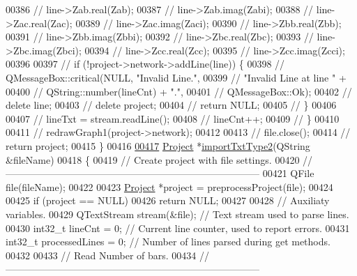 \begin{DoxyCode}
00386 \textcolor{comment}{//    line->Zab.real(Zab);}
00387 \textcolor{comment}{//    line->Zab.imag(Zabi);}
00388 \textcolor{comment}{//    line->Zac.real(Zac);}
00389 \textcolor{comment}{//    line->Zac.imag(Zaci);}
00390 \textcolor{comment}{//    line->Zbb.real(Zbb);}
00391 \textcolor{comment}{//    line->Zbb.imag(Zbbi);}
00392 \textcolor{comment}{//    line->Zbc.real(Zbc);}
00393 \textcolor{comment}{//    line->Zbc.imag(Zbci);}
00394 \textcolor{comment}{//    line->Zcc.real(Zcc);}
00395 \textcolor{comment}{//    line->Zcc.imag(Zcci);}
00396 
00397 \textcolor{comment}{//    if (!project->network->addLine(line)) \{}
00398 \textcolor{comment}{//      QMessageBox::critical(NULL, "Invalid Line.",}
00399 \textcolor{comment}{//                            "Invalid Line at line " +}
00400 \textcolor{comment}{//                            QString::number(lineCnt) + ".",}
00401 \textcolor{comment}{//                            QMessageBox::Ok);}
00402 \textcolor{comment}{//      delete line;}
00403 \textcolor{comment}{//      delete project;}
00404 \textcolor{comment}{//      return NULL;}
00405 \textcolor{comment}{//    \}}
00406 
00407 \textcolor{comment}{//    lineTxt = stream.readLine();}
00408 \textcolor{comment}{//    lineCnt++;}
00409 \textcolor{comment}{//  \}}
00410 
00411 \textcolor{comment}{//  redrawGraph1(project->network);}
00412 
00413 \textcolor{comment}{//  file.close();}
00414 \textcolor{comment}{//  return project;}
00415 \}
00416 
\hypertarget{import_8cpp_source_l00417}{}\hyperlink{import_8h_a05a39d4117f6721dc4bbdd7d45bcdd45}{00417} \hyperlink{class_project}{Project} *\hyperlink{import_8cpp_a05a39d4117f6721dc4bbdd7d45bcdd45}{importTxtType2}(QString &fileName)
00418 \{
00419 \textcolor{comment}{// Create project with file settings.}
00420 \textcolor{comment}{//------------------------------------------------------------------------------}
00421   QFile file(fileName);
00422 
00423   \hyperlink{class_project}{Project} *project = preprocessProject(file);
00424 
00425   \textcolor{keywordflow}{if} (project == NULL)
00426     \textcolor{keywordflow}{return} NULL;
00427 
00428   \textcolor{comment}{// Auxiliaty variables.}
00429   QTextStream stream(&file); \textcolor{comment}{// Text stream used to parse lines.}
00430   int32\_t lineCnt = 0; \textcolor{comment}{// Current line counter, used to report errors.}
00431   int32\_t processedLines = 0; \textcolor{comment}{// Number of lines parsed during get methods.}
00432 
00433 \textcolor{comment}{// Read Number of bars.}
00434 \textcolor{comment}{//------------------------------------------------------------------------------}

\end{DoxyCode}
